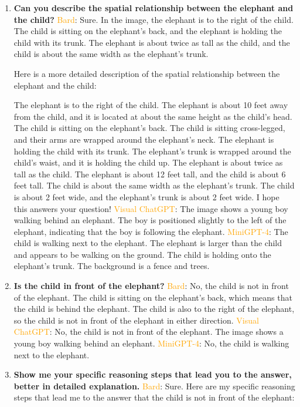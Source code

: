     \begin{enumerate}
        \item \textbf{Can you describe the spatial relationship between the elephant and the child?}
        \subitem \textcolor{orange}{Bard}:
        Sure. In the image, the elephant is to the right of the child. The child is sitting on the elephant's back, and the elephant is holding the child with its trunk. The elephant is about twice as tall as the child, and the child is about the same width as the elephant's trunk.
        
        Here is a more detailed description of the spatial relationship between the elephant and the child:
        
        The elephant is to the right of the child. The elephant is about 10 feet away from the child, and it is located at about the same height as the child's head.
        The child is sitting on the elephant's back. The child is sitting cross-legged, and their arms are wrapped around the elephant's neck.
        The elephant is holding the child with its trunk. The elephant's trunk is wrapped around the child's waist, and it is holding the child up.
        The elephant is about twice as tall as the child. The elephant is about 12 feet tall, and the child is about 6 feet tall.
        The child is about the same width as the elephant's trunk. The child is about 2 feet wide, and the elephant's trunk is about 2 feet wide.
        I hope this answers your question!
        \subitem \textcolor{orange}{Visual ChatGPT}: The image shows a young boy walking behind an elephant. The boy is positioned slightly to the left of the elephant, indicating that the boy is following the elephant.
        \subitem \textcolor{orange}{MiniGPT-4}: The child is walking next to the elephant. The elephant is larger than the child and appears to be walking on the ground. The child is holding onto the elephant’s trunk. The background is a fence and trees.
        \item \textbf{Is the child in front of the elephant?}
        \subitem \textcolor{orange}{Bard}: 
        No, the child is not in front of the elephant. The child is sitting on the elephant's back, which means that the child is behind the elephant. The child is also to the right of the elephant, so the child is not in front of the elephant in either direction.
        \subitem \textcolor{orange}{Visual ChatGPT}: No, the child is not in front of the elephant. The image shows a young boy walking behind an elephant.
        \subitem \textcolor{orange}{MiniGPT-4}: No, the child is walking next to the elephant.
        \item \textbf{Show me your specific reasoning steps that lead you to the answer, better in detailed explanation.}
        \subitem \textcolor{orange}{Bard}:
        Sure. Here are my specific reasoning steps that lead me to the answer that the child is not in front of the elephant:


\end{enumerate}
